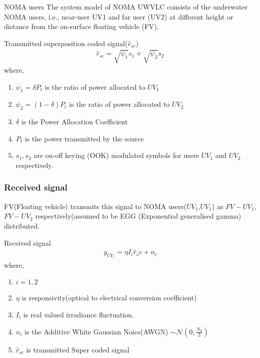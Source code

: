\documentclass{beamer}
\begin{document}
\begin{frame}
\begin{block}{NOMA users}
The system model of NOMA UWVLC consists of the
underwater NOMA users, i.e., near-user UV1 and far user
(UV2) at different height or distance from the on-surface
floating vehicle (FV).
\end{block}
\begin{block}{Transmitted superposition coded signal(${\hat{r}}_{sc}$)}
\begin{align}
{\hat{r}}_{sc}=\sqrt{\psi_1}s_1 + \sqrt{\psi_2}s_2 \label{rsc}
\end{align}
where,\\
\begin{enumerate}
\item $\psi_1=\delta P_t$ is the ratio of power allocated to $UV_1$
\item $\psi_2=(1-\delta) P_t$ is the ratio of power allocated to $UV_2$
\item $\delta$ is the Power Allocation Coefficient
\item $P_t$ is the power transmitted by the source
\item $s_1,s_2$ are on-off keying (OOK) modulated symbols for users $UV_1$
and $UV_2$ respectively.
\end{enumerate}
\end{block}
\end{frame}


\begin{frame}
\frametitle{Received signal}
FV(Floating vehicle) transmits this signal to NOMA users($UV_1$,$UV_1$) as $FV-UV_1$,$FV-UV_2$ respectively(assumed to be EGG (Exponential generalised gamma) distributed.
\begin{block}{Received signal}
\begin{align}
y_{UV_i} = \eta I_i \hat{r}_sc +n_i  \label{yuv}
\end{align}
where,\\
\begin{enumerate}
\item $i=1,2$
\item $\eta$ is responsivity(optical to electrical conversion coefficient)
\item $I_i$ is real valued irradiance fluctuation.
\item $n_i$ is the Additive White Gaussian Noice(AWGN) $ \sim \mathcal{N}(0,\frac{N_0}{2})$
\item ${\hat{r}}_{sc}$ is transmitted Super coded signal
\end{enumerate}
\end{block}
\end{frame}
\end{document}
